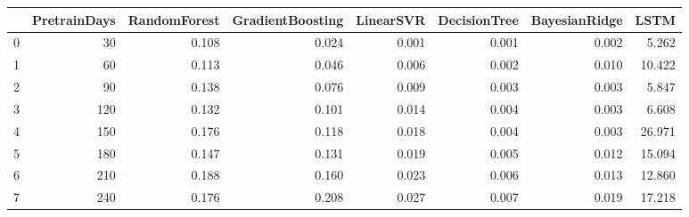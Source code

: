 \begin{tabular}{lrrrrrrr}
\toprule
{} &  PretrainDays &  RandomForest &  GradientBoosting &  LinearSVR &  DecisionTree &  BayesianRidge &   LSTM \\
\midrule
0 &            30 &         0.108 &             0.024 &      0.001 &         0.001 &          0.002 &  5.262 \\
1 &            60 &         0.113 &             0.046 &      0.006 &         0.002 &          0.010 & 10.422 \\
2 &            90 &         0.138 &             0.076 &      0.009 &         0.003 &          0.003 &  5.847 \\
3 &           120 &         0.132 &             0.101 &      0.014 &         0.004 &          0.003 &  6.608 \\
4 &           150 &         0.176 &             0.118 &      0.018 &         0.004 &          0.003 & 26.971 \\
5 &           180 &         0.147 &             0.131 &      0.019 &         0.005 &          0.012 & 15.094 \\
6 &           210 &         0.188 &             0.160 &      0.023 &         0.006 &          0.013 & 12.860 \\
7 &           240 &         0.176 &             0.208 &      0.027 &         0.007 &          0.019 & 17.218 \\
\bottomrule
\end{tabular}
